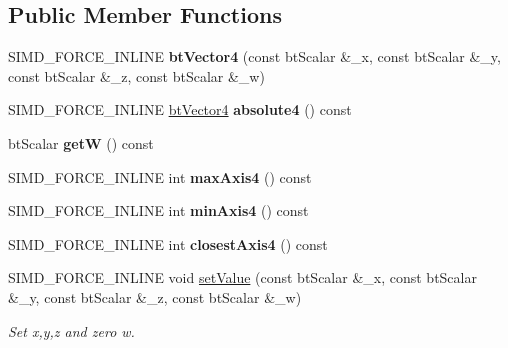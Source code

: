 \subsection*{Public Member Functions}
\begin{DoxyCompactItemize}
\item 
\mbox{\label{classbtVector4_a0bea2b686b70b34f200c5b9170313a8f}} 
S\+I\+M\+D\+\_\+\+F\+O\+R\+C\+E\+\_\+\+I\+N\+L\+I\+NE {\bfseries bt\+Vector4} (const bt\+Scalar \&\+\_\+x, const bt\+Scalar \&\+\_\+y, const bt\+Scalar \&\+\_\+z, const bt\+Scalar \&\+\_\+w)
\item 
\mbox{\label{classbtVector4_ad2e7c85de1bd51dc03f7e7e0fcb2bc4e}} 
S\+I\+M\+D\+\_\+\+F\+O\+R\+C\+E\+\_\+\+I\+N\+L\+I\+NE \hyperlink{classbtVector4}{bt\+Vector4} {\bfseries absolute4} () const
\item 
\mbox{\label{classbtVector4_aa5e27c8aa32b7f8ad8cdd96498fff837}} 
bt\+Scalar {\bfseries getW} () const
\item 
\mbox{\label{classbtVector4_af8547425d68728896fcc3b32fbf663d5}} 
S\+I\+M\+D\+\_\+\+F\+O\+R\+C\+E\+\_\+\+I\+N\+L\+I\+NE int {\bfseries max\+Axis4} () const
\item 
\mbox{\label{classbtVector4_a43e9d85b6230e3960946aac62021b80a}} 
S\+I\+M\+D\+\_\+\+F\+O\+R\+C\+E\+\_\+\+I\+N\+L\+I\+NE int {\bfseries min\+Axis4} () const
\item 
\mbox{\label{classbtVector4_a6aabaf2fc5ec47af13b2c0accb4cbdda}} 
S\+I\+M\+D\+\_\+\+F\+O\+R\+C\+E\+\_\+\+I\+N\+L\+I\+NE int {\bfseries closest\+Axis4} () const
\item 
S\+I\+M\+D\+\_\+\+F\+O\+R\+C\+E\+\_\+\+I\+N\+L\+I\+NE void \hyperlink{classbtVector4_a7653b136836ef8c5f66d20cb11a86ceb}{set\+Value} (const bt\+Scalar \&\+\_\+x, const bt\+Scalar \&\+\_\+y, const bt\+Scalar \&\+\_\+z, const bt\+Scalar \&\+\_\+w)
\begin{DoxyCompactList}\small\item\em Set x,y,z and zero w. \end{DoxyCompactList}\item 
\mbox{\label{classbtVector4_a0bea2b686b70b34f200c5b9170313a8f}} 

\end{DoxyCompactItemize}
